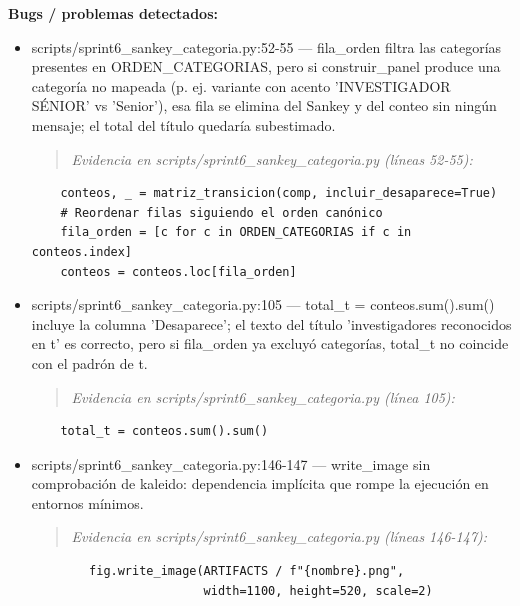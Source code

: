 \begin{tcolorbox}[riesgo]
\textbf{Bugs / problemas detectados:}
\begin{itemize}
  \item scripts/sprint6\_sankey\_categoria.py:52-55 --- fila\_orden filtra las categorías presentes en ORDEN\_CATEGORIAS, pero si construir\_panel produce una categoría no mapeada (p. ej. variante con acento 'INVESTIGADOR SÉNIOR' vs 'Senior'), esa fila se elimina del Sankey y del conteo sin ningún mensaje; el total del título quedaría subestimado.
\begin{quote}\footnotesize\ttfamily
\noindent\emph{Evidencia en scripts/sprint6\_sankey\_categoria.py (líneas 52-55):}
\end{quote}
\begin{lstlisting}
    conteos, _ = matriz_transicion(comp, incluir_desaparece=True)
    # Reordenar filas siguiendo el orden canónico
    fila_orden = [c for c in ORDEN_CATEGORIAS if c in conteos.index]
    conteos = conteos.loc[fila_orden]
\end{lstlisting}

  \item scripts/sprint6\_sankey\_categoria.py:105 --- total\_t = conteos.sum().sum() incluye la columna 'Desaparece'; el texto del título 'investigadores reconocidos en t' es correcto, pero si fila\_orden ya excluyó categorías, total\_t no coincide con el padrón de t.
\begin{quote}\footnotesize\ttfamily
\noindent\emph{Evidencia en scripts/sprint6\_sankey\_categoria.py (línea 105):}
\end{quote}
\begin{lstlisting}
    total_t = conteos.sum().sum()
\end{lstlisting}

  \item scripts/sprint6\_sankey\_categoria.py:146-147 --- write\_image sin comprobación de kaleido: dependencia implícita que rompe la ejecución en entornos mínimos.
\begin{quote}\footnotesize\ttfamily
\noindent\emph{Evidencia en scripts/sprint6\_sankey\_categoria.py (líneas 146-147):}
\end{quote}
\begin{lstlisting}
        fig.write_image(ARTIFACTS / f"{nombre}.png",
                        width=1100, height=520, scale=2)
\end{lstlisting}

\end{itemize}
\end{tcolorbox}

